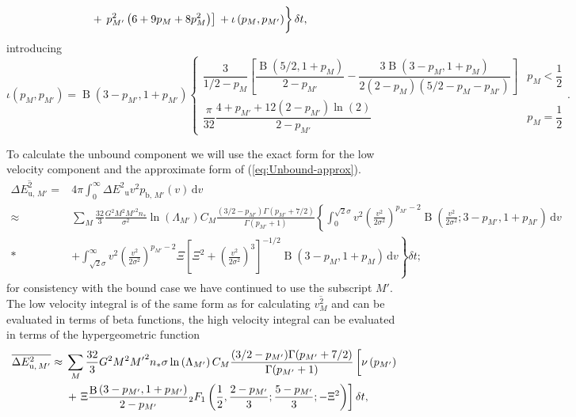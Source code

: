 \documentclass[useAMS,usedcolumn,usegraphicx,usenatbib]{mn2e}
\newcommand{\eqnref}[1]{(\ref{eq:#1})}
\DeclareMathOperator{\Beta}{B}
\newcommand{\sub}[1]{\ensuremath{_\mathrm{#1}}}
\newcommand{\dd}{\ensuremath{\mathrm{d}}}
\newcommand{\intd}[4]{\ensuremath{\displaystyle \int_{#1}^{#2}{#3}\,\dd{#4}}}
\newcommand{\recip}[1]{\ensuremath{\dfrac{1}{#1}}}
\begin{document}
\begin{onecolumn}
\begin{align}
 {} + & \left. \left. p_{M'}^2\left(6 + 9p_M + 8p_M^2\right)\right]  \vphantom{\recip{210}} + \iota \left(p_M,p_{M'}\right) \right\} \delta t,
\end{align}
introducing
\begin{equation}
\iota\left(p_M,p_{M'}\right) = \Beta\left(3-p_{M'},1+p_{M'}\right) \begin{cases} \dfrac{3}{1/2 - p_M}\left[\dfrac{\Beta\left(5/2,1+p_M\right)}{2-p_{M'}} - \dfrac{3\Beta\left(3-p_M,1+p_M\right)}{2\left(2-p_M\right)\left(5/2 - p_M - p_{M'}\right)}\right] & p_M < \recip{2} \\
\dfrac{\pi}{32}\dfrac{4 + p_{M'} + 12 \left(2 - p_{M'}\right) \ln(2)}{2-p_{M'}} & p_M = \recip{2} \end{cases}.
\end{equation}

To calculate the unbound component we will use the exact form for the low velocity component and the approximate form of \eqnref{Unbound-approx}. 
\begin{align}
\overline{\Delta E^2_{\mathrm{u},\,M'}} = {} & 4\pi\intd{0}{\infty}{\Delta E^2\sub{u} v^2 p_{\mathrm{b},\,M'}(v)}{v} \\
 \approx {} & \sum_M\frac{32}{3}\frac{G^2M^2{M'}^2n_\ast}{\sigma^2}\ln\left(\Lambda_{M'}\right) C_M \frac{(3/2 - p_{M'})\Gamma(p_{M'} + 7/2)}{\Gamma(p_{M'} + 1)} \left\{ \intd{0}{\sqrt{2}\sigma}{v^2\left(\frac{v^2}{2\sigma^2}\right)^{p_{M'}-2}\Beta\left(\frac{v^2}{2\sigma^2};3-p_{M'},1+p_{M'}\right)}{v} \right. \nonumber \\* 
 {} & + \left. \intd{\sqrt{2}\sigma}{\infty}{v^2\left(\frac{v^2}{2\sigma^2}\right)^{p_{M'}-2} \Xi\left[\Xi^2 + \left(\frac{v^2}{2\sigma^2}\right)^3\right]^{-1/2} \Beta\left(3-p_M,1+p_M\right)}{v} \right\} \delta t;
\end{align}
for consistency with the bound case we have continued to use the subscript $M'$. The low velocity integral is of the same form as for calculating $\overline{v^2_M}$ and can be evaluated in terms of beta functions, the high velocity integral can be evaluated in terms of the hypergeometric function~\citep[15.6.1]{Olver2010}
\begin{align}
\overline{\Delta E^2_{\mathrm{u},\,M'}} \approx {} & \sum_M\frac{32}{3}G^2M^2{M'}^2n_\ast\sigma\ln\left(\Lambda_{M'}\right) C_M \frac{(3/2 - p_{M'})\Gamma(p_{M'} + 7/2)}{\Gamma(p_{M'} + 1)} \left[\nu\left(p_{M'}\right) \vphantom{\recip{2}} \right. \nonumber \\
  & + \left. \Xi\frac{\Beta\left(3-p_{M'},1+p_{M'}\right)}{2-p_{M'}}{_2F_1}\left(\recip{2},\frac{2-p_{M'}}{3};\frac{5-p_{M'}}{3};-\Xi^2\right) \right] \delta t,

\end{align}
\end{onecolumn}
\end{document}
